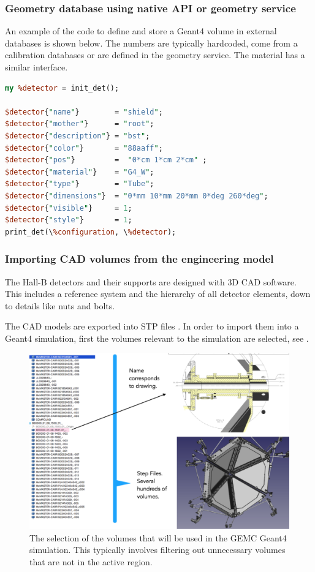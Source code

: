 \subsubsection{Geometry database using native API or geometry service}

An example of the code to define and store a Geant4 volume in external databases is shown below. The
numbers are typically hardcoded, come from a calibration databases or are defined in the geometry service. The material
has a similar interface.

\begin{lstlisting}[language=Perl]
my %detector = init_det();

$detector{"name"}        = "shield";
$detector{"mother"}      = "root";
$detector{"description"} = "bst";
$detector{"color"}       = "88aaff";
$detector{"pos"}         =  "0*cm 1*cm 2*cm" ;
$detector{"material"}    = "G4_W";
$detector{"type"}        = "Tube";
$detector{"dimensions"}  = "0*mm 10*mm 20*mm 0*deg 260*deg";
$detector{"visible"}     = 1;
$detector{"style"}       = 1;
print_det(\%configuration, \%detector);

\end{lstlisting}


\subsubsection{Importing CAD volumes from the engineering model}

The Hall-B detectors and their supports are designed with 3D CAD software. This includes a reference system and the
hierarchy of all detector elements, down to details like nuts and bolts.

The CAD models are exported into STP files \cite{stepFiles}.
In order to import them into a Geant4 simulation, first the volumes relevant to the simulation are selected, see .

\begin{figure}
	\centering
	\includegraphics[width=0.98\columnwidth,keepaspectratio]{img/cadSelection.png}
	\caption{The selection of the volumes that will be used in the GEMC Geant4 simulation.
             This typically involves filtering out unnecessary volumes that are not in the active region.}
	\label{fig:cadSelection}
\end{figure}

